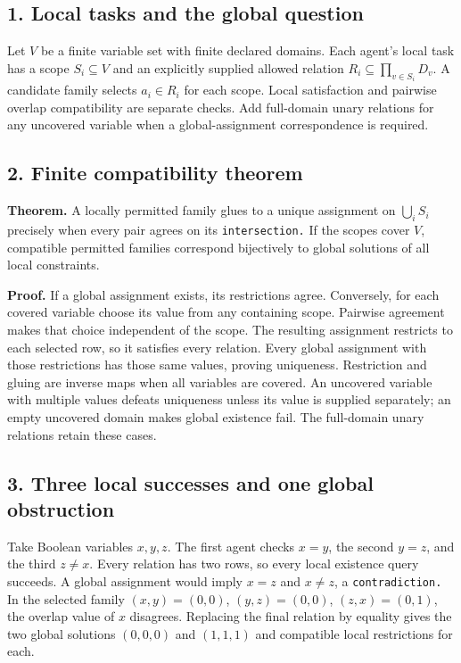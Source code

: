 \documentclass[
  11pt,
]{article}
\begin{document}
\subsection{1. Local tasks and the global
question}\label{local-tasks-and-the-global-question}

Let \(V\) be a finite variable set with finite declared domains. Each
agent's local task has a scope \(S_i\subseteq V\) and an explicitly
supplied allowed relation \(R_i\subseteq\prod_{v\in S_i}D_v\). A
candidate family selects \(a_i\in R_i\) for each scope. Local
satisfaction and pairwise overlap compatibility are separate checks. Add
full-domain unary relations for any uncovered variable when a
global-assignment correspondence is required.

\subsection{2. Finite compatibility
theorem}\label{finite-compatibility-theorem}

\textbf{Theorem.} A locally permitted family glues to a unique
assignment on \(\bigcup_i S_i\) precisely when every pair agrees on its
\nolinkurl{intersection.} If the scopes cover \(V\), compatible
permitted families correspond bijectively to global solutions of all
local constraints.

\textbf{Proof.} If a global assignment exists, its restrictions agree.
Conversely, for each covered variable choose its value from any
containing scope. Pairwise agreement makes that choice independent of
the scope. The resulting assignment restricts to each selected row, so
it satisfies every relation. Every global assignment with those
restrictions has those same values, proving uniqueness. Restriction and
gluing are inverse maps when all variables are covered. An uncovered
variable with multiple values defeats uniqueness unless its value is
supplied separately; an empty uncovered domain makes global existence
fail. The full-domain unary relations retain these cases.

\subsection{3. Three local successes and one global
obstruction}\label{three-local-successes-and-one-global-obstruction}

Take Boolean variables \(x,\allowbreak y,\allowbreak z\). The first
agent checks \(x=y\), the second \(y=z\), and the third \(z\ne x\).
Every relation has two rows, so every local existence query succeeds. A
global assignment would imply \(x=z\) and \(x\ne z\), a
\nolinkurl{contradiction.} In the selected family
\((x,\allowbreak y)=(0,\allowbreak 0)\),
\((y,\allowbreak z)=(0,\allowbreak 0)\),
\((z,\allowbreak x)=(0,\allowbreak 1)\), the overlap value of \(x\)
disagrees. Replacing the final relation by equality gives the two global
solutions \((0,\allowbreak 0,\allowbreak 0)\) and
\((1,\allowbreak 1,\allowbreak 1)\) and compatible local restrictions
for each.
\end{document}

